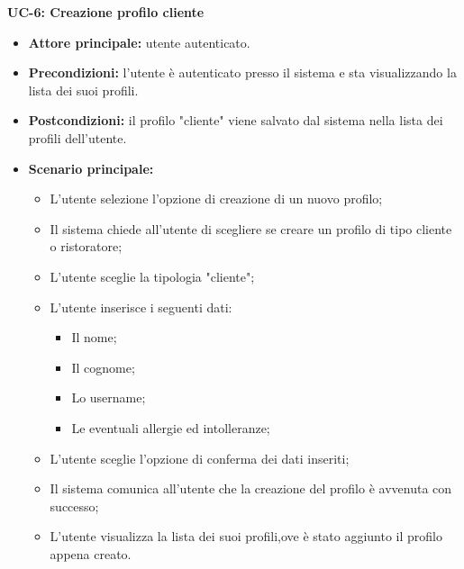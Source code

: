 \textbf{UC-6: Creazione profilo cliente}
\begin{itemize}
    \item \textbf{Attore principale:} utente autenticato.
    \item \textbf{Precondizioni:} l'utente è autenticato presso il sistema e sta visualizzando
    la lista dei suoi profili.
    \item \textbf{Postcondizioni:} il profilo "cliente" viene salvato dal sistema nella lista dei profili 
    dell'utente.
    \item \textbf{Scenario principale:}
    \begin{itemize}
        \item L'utente selezione l'opzione di creazione di un nuovo profilo;
        \item Il sistema chiede all'utente di scegliere se creare un profilo di tipo cliente
        o ristoratore;
        \item L'utente sceglie la tipologia "cliente";
        \item L'utente inserisce i seguenti dati:
        \begin{itemize}
            \item Il nome;
            \item Il cognome;
            \item Lo username;
            \item Le eventuali allergie ed intolleranze;
        \end{itemize}
        \item L'utente sceglie l'opzione di conferma dei dati inseriti;
        \item Il sistema comunica all'utente che la creazione del profilo è avvenuta con successo;
        \item L'utente visualizza la lista dei suoi profili,ove è stato aggiunto il profilo appena creato.
    \end{itemize}
\end{itemize}

